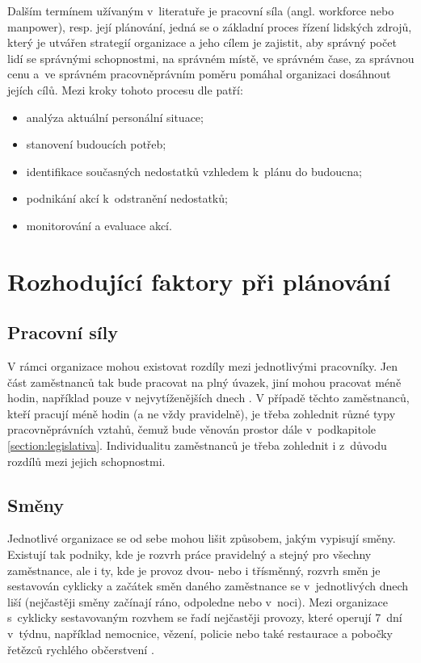 \documentclass[twoside]{ctuthesis}
\begin{document}
Dalším termínem užívaným v~literatuře je pracovní síla (angl. workforce nebo manpower), resp. její plánování, jedná se o základní proces řízení lidských zdrojů, který je utvářen strategií organizace a jeho cílem je zajistit, aby správný počet lidí se správnými schopnostmi, na správném místě, ve správném čase, za správnou cenu a~ve správném pracovněprávním poměru pomáhal organizaci dosáhnout jejích cílů. Mezi kroky tohoto procesu dle \cite{cipd2020workforce} patří:
\begin{itemize}
	\item analýza aktuální personální situace;
	\item stanovení budoucích potřeb;
	\item identifikace současných nedostatků vzhledem k~plánu do budoucna;
	\item podnikání akcí k~odstranění nedostatků;
	\item monitorování a evaluace akcí.
\end{itemize}

\section{Rozhodující faktory při plánování}

\subsection{Pracovní síly}
V rámci organizace mohou existovat rozdíly mezi jednotlivými pracovníky. Jen část zaměstnanců tak bude pracovat na plný úvazek, jiní mohou pracovat méně hodin, například pouze v nejvytíženějších dnech \cite{lin2015}. V případě těchto zaměstnanců, kteří pracují méně hodin (a ne vždy pravidelně), je třeba zohlednit různé typy pracovněprávních vztahů, čemuž bude věnován prostor dále v~podkapitole \ref{section:legislativa}. Individualitu zaměstnanců je třeba zohlednit i z~důvodu rozdílů mezi jejich schopnostmi.

\subsection{Směny}
\label{sub:smeny}
Jednotlivé organizace se od sebe mohou lišit způsobem, jakým vypisují směny. Existují tak podniky, kde je rozvrh práce pravidelný a stejný pro všechny zaměstnance, ale i ty, kde je provoz dvou- nebo i třísměnný, rozvrh směn je sestavován cyklicky a začátek směn daného zaměstnance se v~jed\-not\-li\-vý\-ch dnech liší (nejčastěji směny začínají ráno, odpoledne nebo v~noci). Mezi organizace s~cyklicky sestavovaným rozvhem se řadí nejčastěji provozy, které operují 7~dní v~týdnu, například nemocnice, vězení, policie nebo také restaurace a pobočky řetězců rychlého občerstvení \cite{bechtold1981work}.
\end{document}
